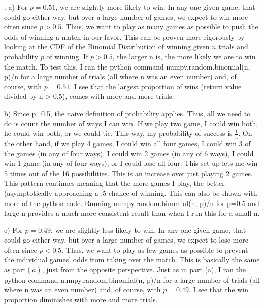 \documentclass[11pt]{article}
\begin{document}
\bigskip

. 
\smallskip
    a) For $p=0.51$, we are slightly more likely to win.  In any one given game, that could go either way, but over a large number of games, we expect to win more often since $p>0.5$.  Thus, we want to play as many games as possible to push the odds of winning a match in our favor.  This can be proven more rigorously by looking at the CDF of the Binomial Distribution of winning given $n$ trials and probability $p$ of winning.  If $p>0.5$, the larger n is, the more likely we are to win the match.  
    To test this, I ran the python command numpy.random.binomial(n, p)/n for a large number of trials (all where n was an even number) and, of course, with $p = 0.51$.  I see that the largest proportion of wins (return value divided by n > 0.5), comes with more and more trials.
    \smallskip

    b) Since p=0.5, the naive definition of probability applies.  Thus, all we need to do is count the number of ways I can win.  If we play two game, I could win both, he could win both, or we could tie. This way, my probability of success is $\frac{1}{4}$. 
    On the other hand, if we play 4 games, I could win all four games, I could win 3 of the games (in any of four ways), I could win 2 games (in any of 6 ways), I could win 1 game (in any of four ways), or I could lose all four.  This set up lets me win 5 times out of the 16 possibilities.  This is an increase over just playing 2 games.  This pattern continues meaning that the more games I play, the better (asymptotically approaching a .5 chance of winning.  
    This can also be shown with more of the python code.  Running numpy.random.binomial(n, p)/n for p=0.5 and large n provides a much more consistent result than when I run this for a small n. 

\smallskip

    c) For $p=0.49$, we are slightly less likely to win.  In any one given game, that could go either way, but over a large number of games, we expect to lose more often since $p<0.5$.  Thus, we want to play as few games as possible to prevent the individual games' odds from taking over the match.  This is basically the same as part$(a)$, just from the opposite perspective.
    Just as in part (a), I ran the python command numpy.random.binomial(n, p)/n for a large number of trials (all where n was an even number) and, of course, with $p = 0.49$.  I see that the win proportion diminishes with more and more trials.
\end{document}
